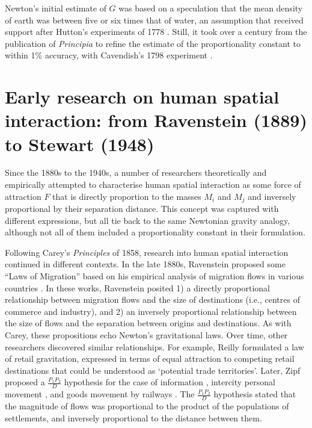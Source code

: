 \documentclass[
  10pt,
  letterpaper,
]{article}
\begin{document}
Newton's initial estimate of \(G\) was based on a speculation that the
mean density of earth was between five or six times that of water, an
assumption that received support after Hutton's experiments of 1778
\citep[p.~783]{hutton_xxxiii_1778}. Still, it took over a century from
the publication of \emph{Principia} to refine the estimate of the
proportionality constant to within 1\% accuracy, with Cavendish's 1798
experiment \citep{cavendish_xxi_1798}.

\section{Early research on human spatial interaction: from Ravenstein
(1889) to Stewart
(1948)}\label{early-research-on-human-spatial-interaction-from-ravenstein-1889-to-stewart-1948}

Since the 1880s to the 1940s, a number of researchers theoretically and
empirically attempted to characterise human spatial interaction as some
force of attraction \(F\) that is directly proportion to the masses
\(M_i\) and \(M_j\) and inversely proportional by their separation
distance. This concept was captured with different expressions, but all
tie back to the same Newtonian gravity analogy, although not all of them
included a proportionality constant in their formulation.

Following Carey's \emph{Principles} of 1858, research into human spatial
interaction continued in different contexts. In the late 1880s,
Ravenstein proposed some ``Laws of Migration'' based on his empirical
analysis of migration flows in various countries
\citep{ravensteinLawsMigration1885, ravensteinLawsMigration1889}. In
these works, Ravenstein posited 1) a directly proportional relationship
between migration flows and the size of destinations (i.e., centres of
commerce and industry), and 2) an inversely proportional relationship
between the size of flows and the separation between origins and
destinations. As with Carey, these propositions echo Newton's
gravitational laws. Over time, other researchers discovered similar
relationships. For example, Reilly \citep{reilly1929methods} formulated
a law of retail gravitation, expressed in terms of equal attraction to
competing retail destinations that could be understood as `potential
trade territories'. Later, Zipf proposed a \(\frac{P_1P_2}{D}\)
hypothesis for the case of information
\citep{zipfDeterminantsCirculationInformation1946}, intercity personal
movement \citep{zipfHypothesisIntercityMovement1946}, and goods movement
by railways \citep{zipfHypothesisCaseRailway1946}. The
\(\frac{P_1P_2}{D}\) hypothesis stated that the magnitude of flows was
proportional to the product of the populations of settlements, and
inversely proportional to the distance between them.
\end{document}
